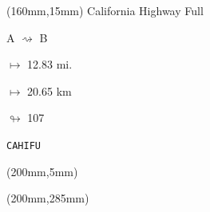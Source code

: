 \begin{textblock*}{40mm}(160mm,15mm)%
California Highway Full
\par A $\rightsquigarrow$ B
\Large
\par$\mapsto$ 12.83 mi.
\par$\mapsto$ 20.65 km
\par$\looparrowright$ 107
\par\hfill\tiny\tt CAHIFU\\
\end{textblock*}
\begin{textblock*}{20mm}(200mm,5mm)%
\fbox{\thepage}
\end{textblock*}
\begin{textblock*}{20mm}(200mm,285mm)%
\fbox{\thepage}
\end{textblock*}
\null\newpage

